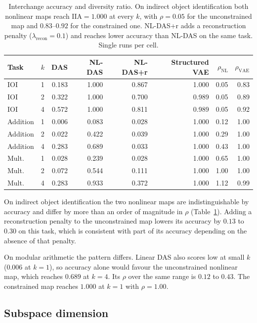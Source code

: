 \documentclass[11pt]{article}
\newcommand{\IIA}{\mathrm{IIA}}
\begin{document}
\begin{table}[t]
\centering
\small
\setlength{\tabcolsep}{4pt}
\begin{tabular}{lc rrrr rr}
\toprule
Task & $k$ & DAS & NL-DAS & NL-DAS+r & Structured VAE & $\rho_\text{NL}$ & $\rho_\text{VAE}$ \\
\midrule
IOI & 1 & 0.183 & 1.000 & 0.867 & 1.000 & 0.05 & 0.83 \\
IOI & 2 & 0.322 & 1.000 & 0.700 & 0.989 & 0.05 & 0.89 \\
IOI & 4 & 0.572 & 1.000 & 0.811 & 0.989 & 0.05 & 0.92 \\
\midrule
Addition & 1 & 0.006 & 0.083 & 0.028 & 1.000 & 0.12 & 1.00 \\
Addition & 2 & 0.022 & 0.422 & 0.039 & 1.000 & 0.29 & 1.00 \\
Addition & 4 & 0.283 & 0.689 & 0.033 & 1.000 & 0.43 & 1.00 \\
\midrule
Mult.\ & 1 & 0.028 & 0.239 & 0.028 & 1.000 & 0.65 & 1.00 \\
Mult.\ & 2 & 0.072 & 0.544 & 0.111 & 1.000 & 1.00 & 1.00 \\
Mult.\ & 4 & 0.283 & 0.933 & 0.372 & 1.000 & 1.12 & 0.99 \\
\bottomrule
\end{tabular}
\caption{Interchange accuracy and diversity ratio. On indirect object
identification both nonlinear maps reach $\IIA = 1.000$ at every $k$, with
$\rho = 0.05$ for the unconstrained map and $0.83$--$0.92$ for the constrained
one. NL-DAS+r adds a reconstruction penalty ($\lambda_\text{recon} = 0.1$) and
reaches lower accuracy than NL-DAS on the same task. Single runs per cell.}
\label{tab:vacuity}
\end{table}

On indirect object identification the two nonlinear maps are indistinguishable by
accuracy and differ by more than an order of magnitude in $\rho$
(Table~\ref{tab:vacuity}). Adding a reconstruction penalty to the unconstrained
map lowers its accuracy by $0.13$ to $0.30$ on this task, which is consistent
with part of its accuracy depending on the absence of that penalty.

On modular arithmetic the pattern differs. Linear DAS also scores low at small
$k$ ($0.006$ at $k = 1$), so accuracy alone would favour the unconstrained
nonlinear map, which reaches $0.689$ at $k = 4$. Its $\rho$ over the same range is
$0.12$ to $0.43$. The constrained map reaches $1.000$ at $k = 1$ with
$\rho = 1.00$.

\subsection{Subspace dimension}
\label{sec:ksweep}
\end{document}
